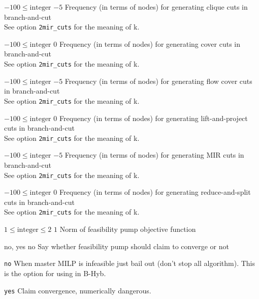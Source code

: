 %
{$-100\leq\textrm{integer}$}%
{$-5$}%
{Frequency (in terms of nodes) for generating clique cuts in branch-and-cut\\
See option \texttt{2mir\_cuts} for the meaning of k.}%
{}

%
{$-100\leq\textrm{integer}$}%
{$0$}%
{Frequency (in terms of nodes) for generating cover cuts in branch-and-cut\\
See option \texttt{2mir\_cuts} for the meaning of k.}%
{}

%
{$-100\leq\textrm{integer}$}%
{$-5$}%
{Frequency (in terms of nodes) for generating flow cover cuts in branch-and-cut\\
See option \texttt{2mir\_cuts} for the meaning of k.}%
{}

%
{$-100\leq\textrm{integer}$}%
{$0$}%
{Frequency (in terms of nodes) for generating lift-and-project cuts in branch-and-cut\\
See option \texttt{2mir\_cuts} for the meaning of k.}%
{}

%
{$-100\leq\textrm{integer}$}%
{$-5$}%
{Frequency (in terms of nodes) for generating MIR cuts in branch-and-cut\\
See option \texttt{2mir\_cuts} for the meaning of k.}%
{}

%
{$-100\leq\textrm{integer}$}%
{$0$}%
{Frequency (in terms of nodes) for generating reduce-and-split cuts in branch-and-cut\\
See option \texttt{2mir\_cuts} for the meaning of k.}%
{}

%
{$1\leq\textrm{integer}\leq2$}%
{$1$}%
{Norm of feasibility pump objective function}%
{}

%
{\ttfamily no, yes}%
{no}%
{Say whether feasibility pump should claim to converge or not}%
{\begin{list}{}{
\setlength{\parsep}{0em}
\setlength{\leftmargin}{5ex}
\setlength{\labelwidth}{2ex}
\setlength{\itemindent}{0ex}
\setlength{\topsep}{0pt}}
\item[\texttt{no}] When master MILP is infeasible just bail out (don't stop all algorithm). This is the option for using in B-Hyb.
\item[\texttt{yes}] Claim convergence, numerically dangerous.
\end{list}
}

